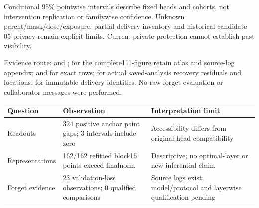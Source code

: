 \documentclass[11pt]{article}
\begin{document}
Conditional 95\% pointwise intervals describe fixed heads and cohorts, not intervention replication or familywise confidence. Unknown parent/mask/dose/exposure, partial delivery inventory and historical candidate 05 privacy remain explicit limits. Current private protection cannot establish past visibility.\par
Evidence route:  and ;  for the complete111-figure retain atlas and source-log appendix;  and  for exact rows;  for actual saved-analysis recovery residuals and locations;  for immutable delivery identities. No raw forget evaluation or collaborator messages were performed.\par
\begin{center}\small\begin{tabularx}{\textwidth}{lXX}\toprule Question & Observation & Interpretation limit\\\midrule
Readouts & 324 positive anchor point gaps; 3 intervals include zero & Accessibility differs from original-head compatibility\\
Representations & 162/162 refitted block16 points exceed finalnorm & Descriptive; no optimal-layer or new inferential claim\\
Forget evidence & 23 validation-loss observations; 0 qualified comparisons & Source logs exist; model/protocol and layerwise qualification pending\\\bottomrule\end{tabularx}\end{center}
\end{document}
